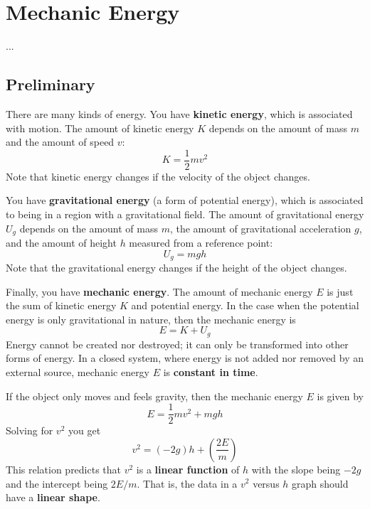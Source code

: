 \chapter{Mechanic Energy}
...
\section{Preliminary}
There are many kinds of energy. You have \textbf{kinetic energy}, which is associated with motion. The amount of kinetic energy $K$ depends on the amount of mass $m$ and the amount of speed $v$:
\begin{equation}
    K = \frac{1}{2} m v^{2}
\end{equation}
Note that kinetic energy changes if the velocity of the object changes.

You have \textbf{gravitational energy} (a form of potential energy), which is associated to being in a region with a gravitational field. The amount of gravitational energy $U_{g}$ depends on the amount of mass $m$, the amount of gravitational acceleration $g$, and the amount of height $h$ measured from a reference point:
\begin{equation}
    U_{g} = m g h
\end{equation}
Note that the gravitational energy changes if the height of the object changes.

Finally, you have \textbf{mechanic energy}. The amount of mechanic energy $E$ is just the sum of kinetic energy $K$ and potential energy. In the case when the potential energy is only gravitational in nature, then the mechanic energy is
\begin{equation}
    E = K + U_{g}
\end{equation}
Energy cannot be created nor destroyed; it can only be transformed into other forms of energy. In a closed system, where energy is not added nor removed by an external source, mechanic energy $E$ is \textbf{constant in time}.

If the object only moves and feels gravity, then the mechanic energy $E$ is given by
\begin{equation}
    E = \frac{1}{2} m v^{2} + m g h
\end{equation}
Solving for $v^{2}$ you get
\begin{equation} \label{eq.07.vv}
    v^{2} = \left( - 2 g \right) h + \left( \frac{2 E}{m} \right)
\end{equation}
This relation predicts that $v^{2}$ is a \textbf{linear function} of $h$ with the slope being $-2g$ and the intercept being $2 E / m$. That is, the data in a $v^{2}$ versus $h$ graph should have a \textbf{linear shape}.
